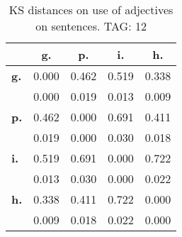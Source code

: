 \begin{table}[h!]
\begin{center}
\begin{tabular}{| l || c | c | c | c |}\hline
 & {\bf g.} & {\bf p.} & {\bf i.} & {\bf h.} \\\hline\hline
{\bf g.} & 0.000 & 0.462 & 0.519 & 0.338 \\
{\bf } & 0.000 & 0.019 & 0.013 & 0.009 \\\hline
{\bf p.} & 0.462 & 0.000 & 0.691 & 0.411 \\
{\bf } & 0.019 & 0.000 & 0.030 & 0.018 \\\hline
{\bf i.} & 0.519 & 0.691 & 0.000 & 0.722 \\
{\bf } & 0.013 & 0.030 & 0.000 & 0.022 \\\hline
{\bf h.} & 0.338 & 0.411 & 0.722 & 0.000 \\
{\bf } & 0.009 & 0.018 & 0.022 & 0.000 \\\hline
\end{tabular}
\caption{KS distances on use of adjectives on sentences. TAG: 12}
\end{center}
\end{table}